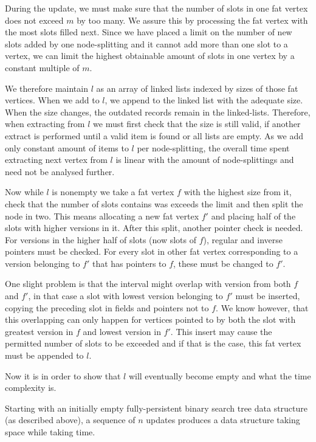 During the update, we must make sure that the number of slots in one fat vertex does not exceed $m$ by too many. We assure this by processing the fat vertex with the most slots filled next. Since we have placed a limit on the number of new slots added by one node-splitting and it cannot add more than one slot to a vertex, we can limit the highest obtainable amount of slots in one vertex by a constant multiple of $m$.

We therefore maintain $l$ as an array of linked lists indexed by sizes of those fat vertices. When we add to $l$, we append to the linked list with the adequate size. When the size changes, the outdated records remain in the linked-lists. Therefore, when extracting from $l$ we must first check that the size is still valid, if another extract is performed until a valid item is found or all lists are empty. As we add only constant amount of items to $l$ per node-splitting, the overall time spent extracting next vertex from $l$ is linear with the amount of node-splittings and need not be analysed further.

Now while $l$ is nonempty we take a fat vertex $f$ with the highest size from it, check that the number of slots contains was exceeds the limit and then split the node in two. This means allocating a new fat vertex $f'$ and placing half of the slots with higher versions in it. After this split, another pointer check is needed. For versions in the higher half of slots (now slots of $f$), regular and inverse pointers must be checked. For every slot in other fat vertex corresponding to a version belonging to $f'$  that has pointers to $f$, these must be changed to $f'$. 

One slight problem is that the interval might overlap with version from both $f$ and $f'$, in that case a slot with lowest version belonging to $f'$ must be inserted, copying the preceding slot in fields and pointers not to $f$. We know however, that this overlapping can only happen for vertices pointed to by both the slot with greatest version in $f$ and lowest version in $f'$. This insert may cause the permitted number of slots to be exceeded and if that is the case, this fat vertex must be appended to $l$.

Now it is in order to show that $l$ will eventually become empty and what the time complexity is.

\begin{prop}
Starting with an initially empty fully-persistent binary search tree data structure (as described above), a sequence of $n$ updates produces a data structure taking  space while taking  time.
\end{prop}

